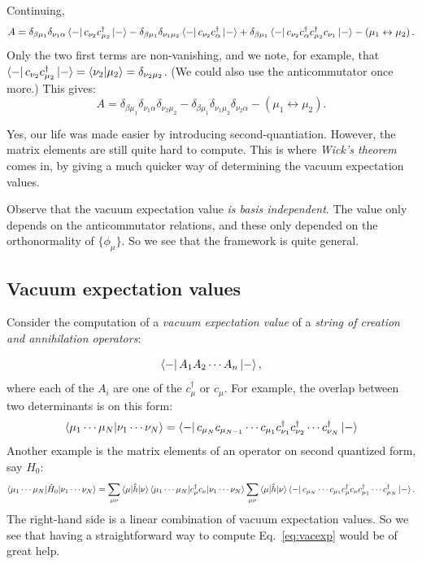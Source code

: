\documentclass{report}
\theoremstyle{plain}
\theoremstyle{definition}
\begin{document}
Continuing,
\begin{equation}
  \begin{split}
    A = \delta_{\beta\mu_1}\delta_{\nu_1\alpha}\bra{-}c_{\nu_2}
     c^\dag_{\mu_2}\ket{-} -
     \delta_{\beta\mu_1}\delta_{\nu_1\mu_2}\bra{-}c_{\nu_2}c^\dag_{\alpha}\ket{-}
     + \delta_{\beta\mu_1} \bra{-}c_{\nu_2} c^\dag_\alpha
     c^\dag_{\mu_2} c_{\nu_1}\ket{-} - \left( \mu_1
         \leftrightarrow \mu_2\right) .
  \end{split}
\end{equation}
Only the two first terms are non-vanishing, and we note, for example,
that $\bra{-}c_{\nu_2} c^\dag_{\mu_2}\ket{-} = \braket{\nu_2|\mu_2} =
\delta_{\nu_2\mu_2}$. (We could also use the anticommutator once
more.) This gives:
\begin{equation}
  A = \delta_{\beta\mu_1} \delta_{\nu_1\alpha} \delta_{\nu_2\mu_2} -
  \delta_{\beta\mu_1}\delta_{\nu_1\mu_2}\delta_{\nu_2\alpha} - (
  \mu_1\leftrightarrow\mu_2).
\end{equation}

Yes, our life was made easier by introducing
second-quantiation. However, the matrix elements are still quite hard
to compute. This is where \emph{Wick's theorem} comes in, by giving a
much quicker way of determining the vacuum expectation values.

Observe that the vacuum expectation value \emph{is basis
  independent}. The value only depends on the anticommutator
relations, and these only depended on the orthonormality of
$\{\phi_\mu\}$. So we see that the framework is quite general.

\subsection{Vacuum expectation values}

Consider the computation of a \emph{vacuum expectation value} of a
\emph{string of creation and annihilation operators}:

\begin{equation}
  \bra{-} A_1 A_2 \cdots A_n \ket{-}, \label{eq:vacexp}
\end{equation}
where each of the $A_i$ are one of the $c^\dag_\mu$ or
$c_\mu$. For example, the overlap between two determinants is on this form:
\begin{equation}
  \braket{\mu_1\cdots \mu_N|\nu_1\cdots\nu_N} = \bra{-} c_{\mu_N}
  c_{\mu_{N-1}} \cdots c_{\mu_1} c^\dag_{\nu_1} c^\dag_{\nu_2} \cdots
  c^\dag_{\nu_N} \ket{-}
\end{equation}
Another example is the matrix elements of an operator on second
quantized form, say $\hat{H}_0$:
\begin{equation}
  \braket{\mu_1\cdots \mu_N|\hat{H}_0|\nu_1\cdots\nu_N} =
  \sum_{\mu\nu} \braket{\mu|\hat{h}|\nu} \braket{\mu_1\cdots
    \mu_N|c^\dag_\mu c_\nu|\nu_1\cdots\nu_N}
  \sum_{\mu\nu} \braket{\mu|\hat{h}|\nu} \bra{-}c_{\mu_N} \cdots
  c_{\mu_1} c^\dag_\mu c_\nu c^\dag_{\mu_1}\cdots c^\dag_{\mu_N} \ket{-}.
\end{equation}
The right-hand side is a linear combination of vacuum expectation
values. So we see that having a straightforward way to compute
Eq.~\eqref{eq:vacexp} would be of great help.
\end{document}
